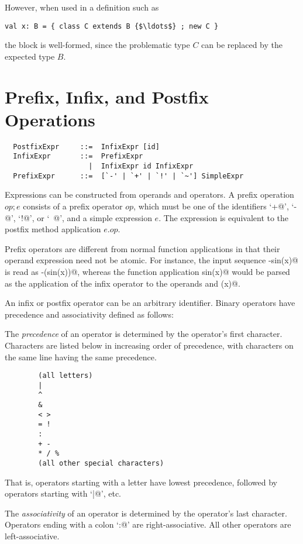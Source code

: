 \documentclass[a4paper,12pt,twoside,titlepage]{book}
\begin{document}
However, when used in a definition such as 
\begin{lstlisting}
val x: B = { class C extends B {$\ldots$} ; new C }
\end{lstlisting}
the block is well-formed, since the problematic type $C$ can be
replaced by the expected type $B$.

\section{Prefix, Infix, and Postfix Operations}
\label{sec:infix-operations}

\syntax\begin{lstlisting}
  PostfixExpr     ::=  InfixExpr [id]
  InfixExpr       ::=  PrefixExpr
                    |  InfixExpr id InfixExpr
  PrefixExpr      ::=  [`-' | `+' | `!' | `~'] SimpleExpr 
\end{lstlisting}

Expressions can be constructed from operands and operators.  A prefix
operation $op;e$ consists of a prefix operator $op$, which
must be one of the identifiers `\lstinline@+@', `\lstinline@-@', `\lstinline@!@', or
`\lstinline@~@', and a simple expression $e$.  The expression is
equivalent to the postfix method application $e.op$.

Prefix operators are different from normal function applications in
that their operand expression need not be atomic. For instance, the
input sequence \lstinline@-sin(x)@ is read as \lstinline@-(sin(x))@, whereas the
function application \lstinline@negate sin(x)@ would be parsed as the
application of the infix operator  to the operands
 and \lstinline@(x)@.

An infix or postfix operator can be an arbitrary identifier. Binary
operators have precedence and associativity defined as follows:

The {\em precedence} of an operator is determined by the operator's first
character. Characters are listed below in increasing order of
precedence, with characters on the same line having the same precedence.
\begin{lstlisting}
        (all letters)
        |
        ^
        &
        < >
        = !
        :
        + -
        * / %
        (all other special characters)
\end{lstlisting}
That is, operators starting with a letter have lowest precedence,
followed by operators starting with `\lstinline@|@', etc.

The {\em associativity} of an operator is determined by the operator's
last character.  Operators ending with a colon `\lstinline@:@' are
right-associative. All other operators are left-associative.
\end{document}
